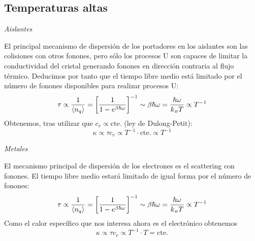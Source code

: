 \subsection*{Temperaturas altas}
\begin{flushright}
  \emph{Aislantes}
\end{flushright}
El principal mecanismo de dispersión de los portadores en los
aislantes son las colisiones con otros fonones, pero sólo los procesos
U son capaces de limitar la conductividad del cristal generando
fonones en dirección contraria al flujo térmico. Deducimos por tanto que el tiempo libre medio está limitado por el número de fonones
disponibles para realizar procesos U:
\begin{equation*}
  \tau \propto \frac{1}{\langle n_q \rangle} = \left[ \frac{1}{1- e^{\beta
      \hbar \omega}} \right]^{-1} \sim \beta \hbar \omega =
\frac{\hbar \omega}{k_{\scriptscriptstyle{B}} T} \propto T^{-1}
\end{equation*}
Obtenemos, tras utilizar que $c_v \propto \text{cte.}$ (ley de
Dulong-Petit):
\begin{equation*}
  \kappa \propto \tau c_v \propto T^{-1} \cdot \text{cte.} \propto T^{-1}
\end{equation*}
\begin{flushright}
  \emph{Metales}
\end{flushright}
El mecanismo principal de dispersión de los electrones es el
scattering con fonones. El tiempo libre medio estará limitado de igual
forma por el número de fonones:
\begin{equation*}
  \tau \propto \frac{1}{\langle n_q \rangle} = \left[ \frac{1}{1- e^{\beta
      \hbar \omega}} \right]^{-1} \sim \beta \hbar \omega =
\frac{\hbar \omega}{k_{\scriptscriptstyle{B}} T} \propto T^{-1}
\end{equation*}
Como el calor específico que nos interesa ahora es el electrónico obtenemos
\begin{equation*}
  \kappa \propto \tau c_v \propto T^{-1} \cdot T = \text{cte.}
\end{equation*}

